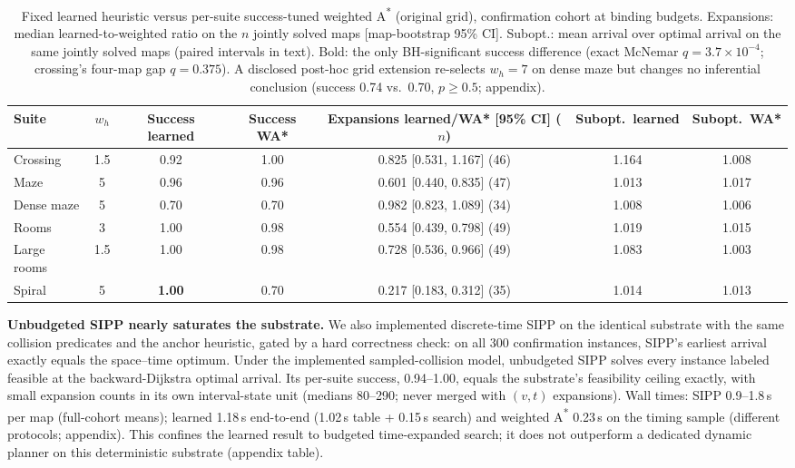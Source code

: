\documentclass[letterpaper]{article} %
\begin{document}
\begin{table}[t]
\centering
\small
\begin{tabular}{lcccccc}
\toprule
Suite & $w_h$ & Success learned & Success WA* & Expansions learned/WA* [95\% CI] ($n$) & Subopt.\ learned & Subopt.\ WA* \\
\midrule
Crossing & 1.5 & 0.92 & 1.00 & 0.825 [0.531, 1.167] (46) & 1.164 & 1.008 \\
Maze & 5 & 0.96 & 0.96 & 0.601 [0.440, 0.835] (47) & 1.013 & 1.017 \\
Dense maze & 5 & 0.70 & 0.70 & 0.982 [0.823, 1.089] (34) & 1.008 & 1.006 \\
Rooms & 3 & 1.00 & 0.98 & 0.554 [0.439, 0.798] (49) & 1.019 & 1.015 \\
Large rooms & 1.5 & 1.00 & 0.98 & 0.728 [0.536, 0.966] (49) & 1.083 & 1.003 \\
Spiral & 5 & \textbf{1.00} & 0.70 & 0.217 [0.183, 0.312] (35) & 1.014 & 1.013 \\
\bottomrule
\end{tabular}
\caption{Fixed learned heuristic versus per-suite success-tuned weighted A\textsuperscript{*} (original grid), confirmation cohort at binding budgets. Expansions: median learned-to-weighted ratio on the $n$ jointly solved maps [map-bootstrap 95\% CI]. Subopt.: mean arrival over optimal arrival on the same jointly solved maps (paired intervals in text). Bold: the only BH-significant success difference (exact McNemar $q{=}3.7\times10^{-4}$; crossing's four-map gap $q{=}0.375$). A disclosed post-hoc grid extension re-selects $w_h{=}7$ on dense maze but changes no inferential conclusion (success 0.74 vs.\ 0.70, $p \geq 0.5$; appendix).}
\label{tab:wastar-main}
\end{table}

\textbf{Unbudgeted SIPP nearly saturates the substrate.} We also implemented discrete-time SIPP \citep{phillips2011sipp} on the identical substrate with the same collision predicates and the anchor heuristic, gated by a hard correctness check: on all 300 confirmation instances, SIPP's earliest arrival exactly equals the space--time optimum. Under the implemented sampled-collision model, unbudgeted SIPP solves every instance labeled feasible at the backward-Dijkstra optimal arrival. Its per-suite success, 0.94--1.00, equals the substrate's feasibility ceiling exactly, with small expansion counts in its own interval-state unit (medians 80--290; never merged with $(v,t)$ expansions). Wall times: SIPP 0.9--1.8\,s per map (full-cohort means); learned 1.18\,s end-to-end (1.02\,s table + 0.15\,s search) and weighted A\textsuperscript{*} 0.23\,s on the timing sample (different protocols; appendix). This confines the learned result to budgeted time-expanded search; it does not outperform a dedicated dynamic planner on this deterministic substrate (appendix table).
\end{document}
